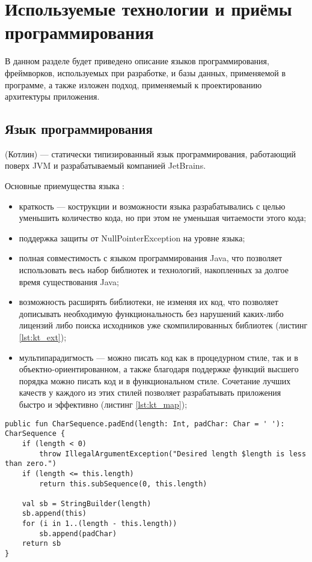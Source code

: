\section{Используемые технологии и приёмы программирования}

В данном разделе будет приведено описание языков программирования, фреймворков,
используемых при разработке, и базы данных, применяемой в программе, а также
изложен подход, применяемый к проектированию архитектуры приложения.

\subsection{Язык программирования \kt{}}
\label{sec:kt}

\kt{} (Котлин) --- статически типизированный язык программирования, работающий поверх 
JVM и разрабатываемый компанией JetBrains.

Основные приемущества языка \kt{}:
\begin{itemize}
  \item краткость --- кострукции и возможности языка разрабатывались с целью уменьшить 
  количество кода, но при этом не уменьшая читаемости этого кода;
  \item поддержка защиты от NullPointerException на уровне языка;
  \item полная совместимость с языком программирования Java, что позволяет использовать
  весь набор библиотек и технологий, накопленных за долгое время существования Java;
  \item возможность расширять библиотеки, не изменяя их код, что позволяет дописывать необходимую 
  функциональность без нарушений каких-либо лицензий либо поиска исходников уже 
  скомпилированных библиотек (листинг \ref{lst:kt_ext});
  \item мультипарадигмость --- \kt{} можно писать код как в процедурном стиле, так и в 
  объектно-ориентированном, а также благодаря поддержке функций высшего порядка можно 
  писать код и в функциональном стиле. Сочетание лучших качеств у каждого из этих стилей 
  позволяет разрабатывать приложения быстро и эффективно (листинг \ref{lst:kt_map});
\end{itemize} 

\begin{lstlisting}[style = ktstyle, 
           caption = {Пример Extension-функции на языке \kt{}},
           label = {lst:kt_ext}]
public fun CharSequence.padEnd(length: Int, padChar: Char = ' '): CharSequence {
    if (length < 0)
        throw IllegalArgumentException("Desired length $length is less than zero.")
    if (length <= this.length)
        return this.subSequence(0, this.length)

    val sb = StringBuilder(length)
    sb.append(this)
    for (i in 1..(length - this.length))
        sb.append(padChar)
    return sb
}
\end{lstlisting}

